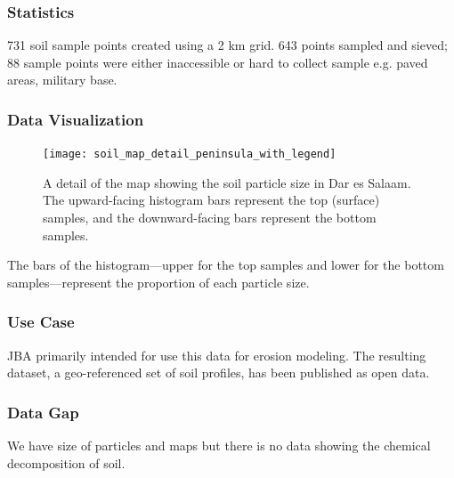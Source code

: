 \documentclass[a4paper,12pt,twoside]{article}
\begin{document}
\subsubsection{Statistics}
731 soil sample points created using a 2 km grid. 643 points sampled and sieved; 88 sample points were either inaccessible or hard to collect sample e.g. paved areas, military base.

\subsubsection{Data Visualization}
\begin{figure}[H]
  \caption{A detail of the map showing the soil particle size in Dar es Salaam. The upward-facing histogram bars represent the top (surface) samples, and the downward-facing bars represent the bottom samples.}
  \centering
  \texttt{[image: soil\_map\_detail\_peninsula\_with\_legend]}
\end{figure}
The bars of the histogram—upper for the top samples and lower for the bottom samples—represent the proportion of each particle size.

\subsubsection{Use Case}
JBA  primarily intended for use this data for erosion modeling. The resulting dataset, a geo-referenced set of soil profiles, has been published as open data.

\subsubsection{Data Gap}
We have size of particles and maps but there is no data showing the chemical decomposition of soil.
\end{document}
